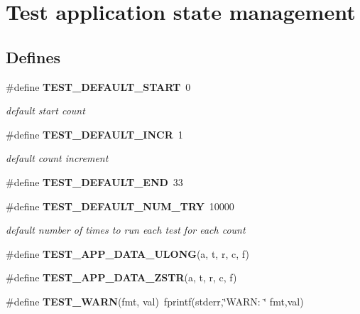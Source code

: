 \section{Test application state management}
\label{group__test__app}
\subsection*{Defines}
\begin{CompactItemize}
\item 
{}
\#define {\bf TEST\_\-DEFAULT\_\-START}\ 0\label{group__test__app_a7}

\begin{CompactList}\small\item\em default start count\item\end{CompactList}\item 
{}
\#define {\bf TEST\_\-DEFAULT\_\-INCR}\ 1\label{group__test__app_a8}

\begin{CompactList}\small\item\em default count increment\item\end{CompactList}\item 
\#define {\bf TEST\_\-DEFAULT\_\-END}\ 33
\item 
{}
\#define {\bf TEST\_\-DEFAULT\_\-NUM\_\-TRY}\ 10000\label{group__test__app_a10}

\begin{CompactList}\small\item\em default number of times to run each test for each count\item\end{CompactList}\item 
\#define {\bf TEST\_\-APP\_\-DATA\_\-ULONG}(a, t, r, c, f)
\item 
\#define {\bf TEST\_\-APP\_\-DATA\_\-ZSTR}(a, t, r, c, f)
\item 
{}
\#define {\bf TEST\_\-WARN}(fmt, val)\ fprintf(stderr,\char`\"{}WARN: \char`\"{} fmt,val)\label{group__test__app_a13}


\end{CompactItemize}

